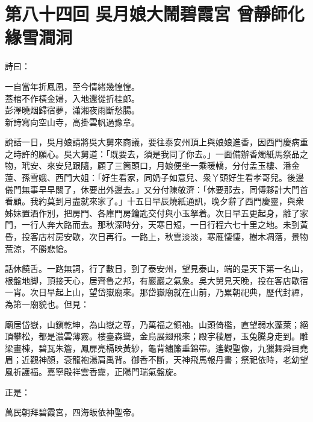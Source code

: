 
\chapter*{第八十四回 吳月娘大鬧碧霞宮 曾靜師化緣雪澗洞}


詩曰：

\begin{myquote}
一自當年折鳳凰，至今情緒幾惶惶。\\蓋棺不作橫金婦，入地還從折桂郎。\\彭澤曉烟歸宿夢，瀟湘夜雨斷愁腸。\\新詩寫向空山寺，高掛雲帆過豫章。
\end{myquote}

說話一日，吳月娘請將吳大舅來商議，要往泰安州頂上與娘娘進香，因西門慶病重之時許的願心。吳大舅道：「既要去，須是我同了你去。」一面備辦香燭紙馬祭品之物，玳安、來安兒跟隨，顧了三箇頭口，月娘便坐一乘暖轎，分付孟玉樓、潘金蓮、孫雪娥、西門大姐：「好生看家，同奶子如意兒、衆丫頭好生看孝哥兒。後邊儀門無事早早關了，休要出外邊去。」又分付陳敬濟：「休要那去，同傅夥計大門首看顧。我約莫到月盡就來家了。」{}十五日早辰燒紙通訊，晚夕辭了西門慶靈，與衆姊妹置酒作別，把房門、各庫門房鑰匙交付與小玉拏着。次日早五更起身，離了家門，一行人奔大路而去。那秋深時分，天寒日短，一日行程六七十里之地。未到黃昏，投客店村房安歇，次日再行。一路上，秋雲淡淡，寒雁悽悽，樹木凋落，景物荒涼，不勝悲愴。

話休饒舌。一路無詞，行了數日，到了泰安州，望見泰山，端的是天下第一名山，根盤地脚，頂接天心，居齊魯之邦，有巖巖之氣象。吳大舅見天晚，投在客店歇宿一宵。次日早起上山，望岱嶽廟來。那岱嶽廟就在山前，乃累朝祀典，歷代封禪，為第一廟貌也。但見：

\begin{myquote}
廟居岱嶽，山鎭乾坤，為山嶽之尊，乃萬福之領袖。山頭倚檻，直望弱水蓬萊；絕頂攀松，都是濃雲薄霧。樓臺森聳，金烏展翅飛來；殿宇稜層，玉兔騰身走到。雕梁畫棟，碧瓦朱簷，鳳扉亮槅映黃紗，龜背繡簾垂錦帶。遙觀聖像，九獵舞舜目堯眉；近觀神顏，袞龍袍湯肩禹背。御香不斷，天神飛馬報丹書；祭祀依時，老幼望風祈護福。嘉寧殿祥雲香靄，正陽門瑞氣盤旋。
\end{myquote}

正是：

\begin{myquote}
萬民朝拜碧霞宮，四海皈依神聖帝。
\end{myquote}

